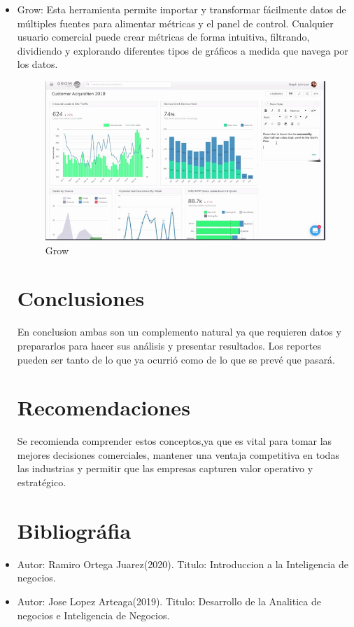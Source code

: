 \documentclass[twoside,twocolumn]{article}
\begin{document}
\begin{itemize}
\item Grow:
Esta herramienta permite importar y transformar fácilmente datos de múltiples fuentes para alimentar métricas y el panel de control. Cualquier usuario comercial puede crear métricas de forma intuitiva, filtrando, dividiendo y explorando diferentes tipos de gráficos a medida que navega por los datos. 

\begin{figure}[h!]
	\centering
	\includegraphics[scale=0.45]{Image/c11.PNG}
	\caption{Grow}
	\label{fig:Csha3}
\end{figure}

\section{Conclusiones}
En conclusion ambas son un complemento natural ya que requieren datos y prepararlos para hacer sus análisis y presentar resultados.
\newline
Los reportes pueden ser tanto de lo que ya ocurrió como de lo que se prevé que pasará.

\section{Recomendaciones}
Se recomienda comprender estos conceptos,ya que es vital para tomar las mejores decisiones comerciales, mantener una ventaja competitiva en todas las industrias y permitir que las empresas capturen valor operativo y estratégico.


\section{Bibliográfia}
\item Autor: Ramiro Ortega Juarez(2020).
\newline
\newline
Titulo: Introduccion a la Inteligencia de negocios.
\newline
\newline
\item Autor: Jose Lopez Arteaga(2019).
\newline
\newline
Titulo: Desarrollo de la Analitica de negocios e Inteligencia de Negocios.
\newline
\newline


\end{itemize}
\end{document}
